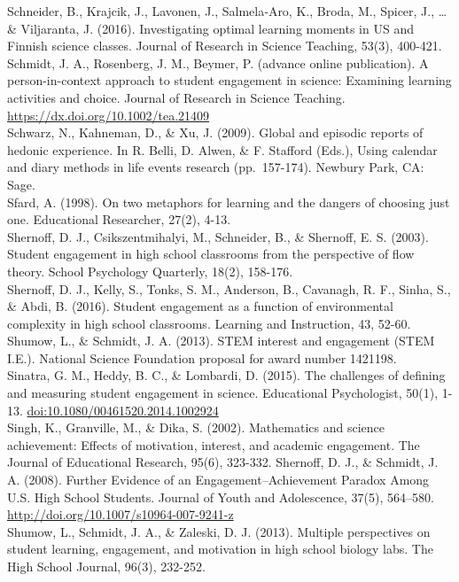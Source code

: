 \documentclass[]{msu-thesis}
\theoremstyle{definition}
\theoremstyle{definition}
\theoremstyle{definition}
\theoremstyle{remark}
\begin{document}
Schneider, B., Krajcik, J., Lavonen, J., Salmela‐Aro, K., Broda, M.,
Spicer, J., \ldots{} \& Viljaranta, J. (2016). Investigating optimal
learning moments in US and Finnish science classes. Journal of Research
in Science Teaching, 53(3), 400-421.\\
Schmidt, J. A., Rosenberg, J. M., Beymer, P. (advance online
publication). A person-in-context approach to student engagement in
science: Examining learning activities and choice. Journal of Research
in Science Teaching. \url{https://dx.doi.org/10.1002/tea.21409}\\
Schwarz, N., Kahneman, D., \& Xu, J. (2009). Global and episodic reports
of hedonic experience. In R. Belli, D. Alwen, \& F. Stafford (Eds.),
Using calendar and diary methods in life events research (pp.~157-174).
Newbury Park, CA: Sage.\\
Sfard, A. (1998). On two metaphors for learning and the dangers of
choosing just one. Educational Researcher, 27(2), 4-13.\\
Shernoff, D. J., Csikszentmihalyi, M., Schneider, B., \& Shernoff, E. S.
(2003). Student engagement in high school classrooms from the
perspective of flow theory. School Psychology Quarterly, 18(2),
158-176.\\
Shernoff, D. J., Kelly, S., Tonks, S. M., Anderson, B., Cavanagh, R. F.,
Sinha, S., \& Abdi, B. (2016). Student engagement as a function of
environmental complexity in high school classrooms. Learning and
Instruction, 43, 52-60.\\
Shumow, L., \& Schmidt, J. A. (2013). STEM interest and engagement (STEM
I.E.). National Science Foundation proposal for award number 1421198.\\
Sinatra, G. M., Heddy, B. C., \& Lombardi, D. (2015). The challenges of
defining and measuring student engagement in science. Educational
Psychologist, 50(1), 1-13. \url{doi:10.1080/00461520.2014.1002924}\\
Singh, K., Granville, M., \& Dika, S. (2002). Mathematics and science
achievement: Effects of motivation, interest, and academic engagement.
The Journal of Educational Research, 95(6), 323-332. Shernoff, D. J., \&
Schmidt, J. A. (2008). Further Evidence of an Engagement--Achievement
Paradox Among U.S. High School Students. Journal of Youth and
Adolescence, 37(5), 564--580.
\url{http://doi.org/10.1007/s10964-007-9241-z}\\
Shumow, L., Schmidt, J. A., \& Zaleski, D. J. (2013). Multiple
perspectives on student learning, engagement, and motivation in high
school biology labs. The High School Journal, 96(3), 232-252.\\
\end{document}
